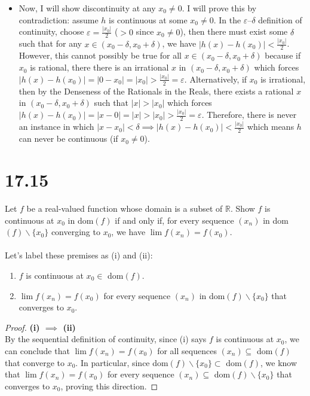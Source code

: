 \documentclass[10pt,a4paper]{article}
\theoremstyle{definition}
\begin{document}
\begin{enumerate}[label = (\alph*)]
\begin{itemize}
	\item Now, I will show discontinuity at any $x_0 \neq 0$. I will prove this by contradiction: assume $h$ is continuous at some $x_0 \neq 0$. In the $\varepsilon$--$\delta$ definition of continuity, choose $\varepsilon = \frac{|x_0|}{2}$ ($> 0$ since $x_0 \neq 0$), then there must exist some $\delta$ such that for any $x \in (x_0 - \delta, x_0 + \delta)$, we have $|h(x) - h(x_0)| < \frac{|x_0|}{2}$. However, this cannot possibly be true for all $x \in (x_0 - \delta, x_0 + \delta)$ because if $x_0$ is rational, there there is an irrational $x$ in $(x_0 - \delta, x_0 + \delta)$ which forces $|h(x) - h(x_0)| = |0 - x_0| = |x_0| > \frac{|x_0|}{2} = \varepsilon$. Alternatively, if $x_0$ is irrational, then by the Denseness of the Rationals in the Reals, there exists a rational $x$ in $(x_0 - \delta, x_0 + \delta)$ such that $|x| > |x_0|$ which forces $|h(x) - h(x_0)| = |x - 0| = |x| > |x_0| > \frac{|x_0|}{2} = \varepsilon$. Therefore, there is never an instance in which $|x - x_0| < \delta \implies |h(x) - h(x_0)| < \frac{|x_0|}{2}$ which means $h$ can never be continuous (if $x_0 \neq 0$).
	\end{itemize}
\end{enumerate}


\section*{17.15}
Let $f$ be a real-valued function whose domain is a subset of $\mathbb{R}$. Show $f$ is continuous at $x_0$ in dom$(f)$ if and only if, for every sequence $(x_n)$ in dom$(f) \backslash \{x_0\}$ converging to $x_0$, we have $\lim f(x_n) = f(x_0)$.
\\
\\Let's label these premises as (i) and (ii):
\begin{enumerate}[label = (\roman*)]
\item $f$ is continuous at $x_0 \in $ dom$(f)$.
\item $\lim f(x_n) = f(x_0)$ for every sequence $(x_n)$ in dom$(f) \backslash \{x_0\}$ that converges to $x_0$. 
\end{enumerate}

\begin{proof}{\textbf{(i) $\implies$ (ii)}}
\\By the sequential definition of continuity, since (i) says $f$ is continuous at $x_0$, we can conclude that $\lim f(x_n)= f(x_0)$ for all sequences $(x_n) \subseteq $ dom$(f)$ that converge to $x_0$. In particular, since dom$(f) \backslash \{x_0\} \subset$ dom$(f)$, we know that $\lim f(x_n) = f(x_0)$ for every sequence $(x_n) \subseteq $ dom$(f) \backslash \{x_0\}$ that converges to $x_0$, proving this direction.
\end{proof}
\end{document}
